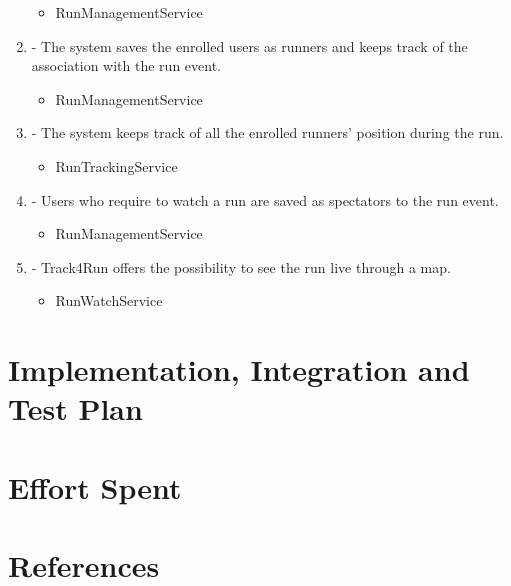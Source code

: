 \documentclass[a4paper]{article}
\begin{document}
\begin{enumerate}[label*=\bf{R.\arabic*}]
\begin{itemize}
\item RunManagementService
\end{itemize}

\item - The system saves the enrolled users as runners and keeps track of the
association with the run event.

\begin{itemize}
\item RunManagementService
\end{itemize}

\item - The system keeps track of all the enrolled runners’ position during
the run.

\begin{itemize}
\item RunTrackingService
\end{itemize}

\item - Users who require to watch a run are saved as spectators to the run
event.

\begin{itemize}
\item RunManagementService
\end{itemize}

\item - Track4Run offers the possibility to see the run live through a map.

\begin{itemize}
\item RunWatchService
\end{itemize}

\end{enumerate}

\section{Implementation, Integration and Test Plan}

\section{Effort Spent}

\section{References}
\end{document}
